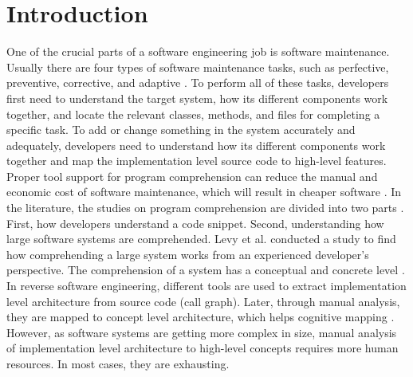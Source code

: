 \section{Introduction}
\label{hla2:introduction}
One of the crucial parts of a software engineering job is software maintenance. Usually there are four types of software maintenance tasks, such as 
 perfective, preventive, corrective, and adaptive \cite{williams2010characterizingArchitectureChanges}. To perform all of these tasks, developers first need to understand the target system, how its different components work together, and locate the relevant classes, methods, and files for completing a specific task. To add or change something in the system accurately and adequately, developers need to understand how its different components work together and map the implementation level source code to high-level features. Proper tool support for program comprehension can reduce the manual and economic cost of software maintenance, which will result in cheaper software \cite{arisholm2006impactUMLDocumentation}. In the literature, the studies on program comprehension are divided into two parts \cite{levy2019understandingLargeHierarchical}. First, how developers understand a code snippet. Second, understanding how large software systems are comprehended. Levy et al. \cite{levy2019understandingLargeHierarchical} conducted a study to find how comprehending a large system works from an experienced developer's perspective. The comprehension of a system has a conceptual and concrete level \cite{bass2003softwareArchitecturePractice, levy2019understandingLargeHierarchical}. In reverse software engineering, different tools are used to extract implementation level architecture from source code (call graph). Later, through manual analysis, they are mapped to concept level architecture, which helps cognitive mapping \cite{roy2008softwareArchitectureRecovery}. However, as software systems are getting more complex in size, manual analysis of implementation level architecture to high-level concepts requires more human resources. In most cases, they are exhausting. 

